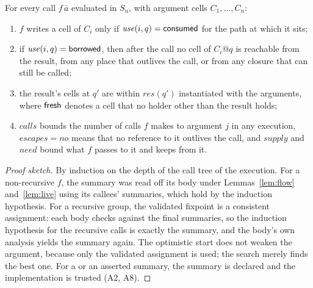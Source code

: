 \begin{lemma}
\label{lem:summary}
For every call $f\,\bar a$ evaluated in $S_u$, with argument cells $C_1, \ldots, C_n$:
\begin{enumerate}
\item $f$ writes a cell of $C_i$ only if $\mathit{use}(i, q) = \mathsf{consumed}$ for the path at which it sits;
\item if $\mathit{use}(i, q) = \mathsf{borrowed}$, then after the call no cell of $C_i@q$ is reachable from the
result, from any place that outlives the call, or from any closure that can still be called;
\item the result's cells at $q'$ are within $\mathit{res}(q')$ instantiated with the arguments, where
$\mathsf{fresh}$ denotes a cell that no holder other than the result holds;
\item $\mathit{calls}$ bounds the number of calls $f$ makes to argument $j$ in any execution,
$\mathit{escapes} = \mathit{no}$ means that no reference to it outlives the call, and $\mathit{supply}$
and $\mathit{need}$ bound what $f$ passes to it and keeps from it.
\end{enumerate}
\end{lemma}
\begin{proof}[Proof sketch]
By induction on the depth of the call tree of the execution. For a non-recursive $f$, the summary was
read off its body under Lemmas~\ref{lem:flow} and~\ref{lem:live} using its callees' summaries, which
hold by the induction hypothesis. For a recursive group, the validated fixpoint is a consistent
assignment: each body checks against the final summaries, so the induction hypothesis for the
recursive calls is exactly the summary, and the body's own analysis yields the summary again. The
optimistic start does not weaken the argument, because only the validated assignment is used; the
search merely finds the best one. For a  or an asserted summary, the summary is declared
and the implementation is trusted (A2, A8).
\end{proof}

